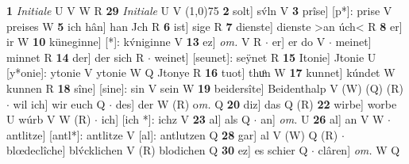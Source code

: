 \documentclass[8pt,a4paper,notitlepage]{article}
\begin{document}
\begin{table}[ht]
\begin{minipage}[t]{0.5\linewidth}
\textbf{1} \textit{Initiale} U V W R  \textbf{29} \textit{Initiale} U V  \newline
\line(1,0){75} \newline
\textbf{2} solt] sv́ln V \textbf{3} prîse] [p*]: prise V preises W \textbf{5} ich hân] han Jch R \textbf{6} ist] sige R \textbf{7} dienste] dienste >an úch< R \textbf{8} er] ir W \textbf{10} küneginne] [*]: kv́niginne V \textbf{13} ez] \textit{om.} V R  $\cdot$ er] er do V  $\cdot$ meinet] minnet R \textbf{14} der] der sich R  $\cdot$ weinet] [seunet]: seÿnet R \textbf{15} Itonie] Jtonie U [y*onie]: ytonie V ytonie W Q Jtonye R \textbf{16} tuot] thuͦn W \textbf{17} kunnet] kúndet W kunnen R \textbf{18} sîne] [sine]: sin V sein W \textbf{19} beidersîte] Beidenthalp V (W) (Q) (R)  $\cdot$ wil ich] wir euch Q  $\cdot$ des] der W (R) o\textit{m. } Q \textbf{20} diz] das Q (R) \textbf{22} wirbe] worbe U wúrb V W (R)  $\cdot$ ich] [ich *]: ichz V \textbf{23} al] als Q  $\cdot$ an] \textit{om.} U \textbf{26} al] an V W  $\cdot$ antlitze] [antl*]: antlitze V [al]: antlutzen Q \textbf{28} gar] al V (W) Q (R)  $\cdot$ blœdeclîche] blv́cklichen V (R) blodichen Q \textbf{30} ez] es schier Q  $\cdot$ clâren] \textit{om.} W Q \newline
\end{minipage}
\end{table}
\end{document}
